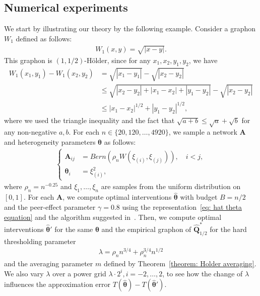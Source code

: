 \documentclass[11pt]{article}
\newcommand{\bA}{\bm{A}}
\newcommand{\bQ}{\bm{Q}}
\newcommand{\btheta}{\bm{\theta}}
\newcommand{\<}{\langle}
\renewcommand{\>}{\rangle}
\theoremstyle{plain}
\theoremstyle{definition}
\theoremstyle{remark}
\begin{document}
 \subsection{Numerical experiments}

 We start by illustrating our theory by the following example. Consider a graphon $W_1$ defined as follows:
 \begin{align*}
     W_1(x, y) = \sqrt{|x - y|}.
 \end{align*}
 This graphon is $(1, 1/2)$-H\"older, since for any $x_1, x_2, y_1, y_2$, we have
 \begin{align*}
     W_1(x_1, y_1) - W_1(x_2, y_2) & = \sqrt{|x_1 - y_1|} - \sqrt{|x_2 - y_2|} \\
     & \le \sqrt{|x_2 - y_2| + |x_1 - x_2| + |y_1 - y_2|} - \sqrt{|x_2 - y_2|} \\
     & \le |x_1 - x_2|^{1/2} + |y_1 - y_2|^{1/2},
 \end{align*}
 where we used the triangle inequality and the fact that $\sqrt{a + b} \le \sqrt{a} + \sqrt{b}$ for any non-negative $a, b$. For each $n \in \{20, 120, \ldots, 4920\}$, we sample a network $\bA$ and heterogeneity parameters $\btheta$ as follows:
 \begin{align}
 \label{eq: experiment sample scheme}
 \begin{cases}
     \bA_{ij} & = Bern(\rho_n W(\xi_{(i)}, \xi_{(j)})), \quad i < j,\\
     \btheta_i & = \xi_{(i)}^2,
 \end{cases}
 \end{align}
 where $\rho_n = n^{-0.25}$ and $\xi_1, \ldots,\xi_n$ are samples from the uniform distribution on $[0, 1]$. For each $\bA$, we compute optimal interventions $\widehat{\btheta}$ with budget $B = n / 2$ and the peer-effect parameter $\gamma = 0.8$ using the representation~\eqref{eq: hat theta equation} and the algorithm suggested in~\citep{gander1989constrained}. Then, we compute optimal interventions $\widehat{\btheta}'$ for the same $\btheta$ and the empirical graphon of $\widehat{\bQ}_{1/2}^*$ for the hard thresholding parameter
 \begin{align*}
     \lambda = \rho_n n^{3/4} + \rho_n^{3/4} n^{1/2}
 \end{align*}
 and the averaging parameter $m$ defined by Theorem~\ref{theorem: Holder averaging}. 
We also vary $\lambda$ over a power grid $\lambda \cdot 2^{i}, i = -2, \ldots, 2$, to see how the change of $\lambda$ influences the approximation error $T(\widehat{\btheta}) - T(\widehat{\btheta}')$.
 
\end{document}
